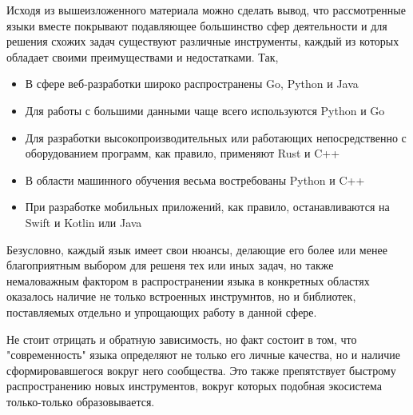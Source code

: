 Исходя из вышеизложенного материала можно сделать вывод, что рассмотренные языки вместе покрывают подавляющее большинство сфер деятельности и для решения схожих задач существуют различные инструменты, каждый из которых обладает своими преимуществами и недостатками. Так,

\begin{itemize}
  \item В сфере веб-разработки широко распространены Go, Python и Java
  \item Для работы с большими данными чаще всего используются Python и Go
  \item Для разработки высокопроизводительных или работающих непосредственно с оборудованием программ, как правило, применяют Rust и C++
  \item В области машинного обучения весьма востребованы Python и C++
  \item При разработке мобильных приложений, как правило, останавливаются на Swift и Kotlin или Java
\end{itemize}

Безусловно, каждый язык имеет свои нюансы, делающие его более или менее благоприятным выбором для решеня тех или иных задач, но также немаловажным фактором в распространении языка в конкретных областях оказалось наличие не только встроенных инструмнтов, но и библиотек, поставляемых отдельно и упрощающих работу в данной сфере.

Не стоит отрицать и обратную зависимость, но факт состоит в том, что "современность" языка определяют не только его личные качества, но и наличие сформировавшегося вокруг него сообщества. Это также препятствует быстрому распространению новых инструментов, вокруг которых подобная экосистема только-только образовывается.
